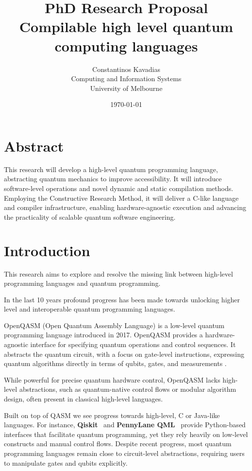 \documentclass[journal,onecolumn, compsoc]{IEEEtran}
\title{PhD Research Proposal\\\large{Compilable high level quantum computing languages}}
\author{Constantinos Kavadias\\Computing and Information Systems\\University of Melbourne}
\date{\today}
\begin{document}
\maketitle

\newpage
\tableofcontents
\newpage

\section*{Abstract}
This research will develop a high-level quantum programming language, abstracting quantum mechanics to improve accessibility. 
It will introduce software-level operations and novel dynamic and static compilation methods. 
Employing the Constructive Research Method, it will deliver a C-like language and compiler infrastructure, enabling hardware-agnostic execution and advancing the practicality of scalable quantum software engineering.

\section{Introduction}
This research aims to explore and resolve the missing link between high-level programming languages and quantum programming.

In the last 10 years profound progress has been made towards unlocking higher level and interoperable quantum programming languages.

OpenQASM (Open Quantum Assembly Language) is a low-level quantum programming language introduced in 2017. OpenQASM provides a hardware-agnostic interface for specifying quantum operations and control sequences. It abstracts the quantum circuit, with a focus on gate-level instructions, expressing quantum algorithms directly in terms of qubits, gates, and measurements \cite{cross2017open}.

While powerful for precise quantum hardware control, OpenQASM lacks high-level abstractions, such as quantum-native control flows or modular algorithm design, often present in classical high-level languages.

Built on top of QASM we see progress towards high-level, C or Java-like languages. For instance, \textbf{Qiskit}~\cite{qiskit} and \textbf{PennyLane QML}~\cite{pennylane} provide Python-based interfaces that facilitate quantum programming, yet they rely heavily on low-level constructs and manual control flows.
Despite recent progress, most quantum programming languages remain close to circuit-level abstractions, requiring users to manipulate gates and qubits explicitly.
\end{document}
